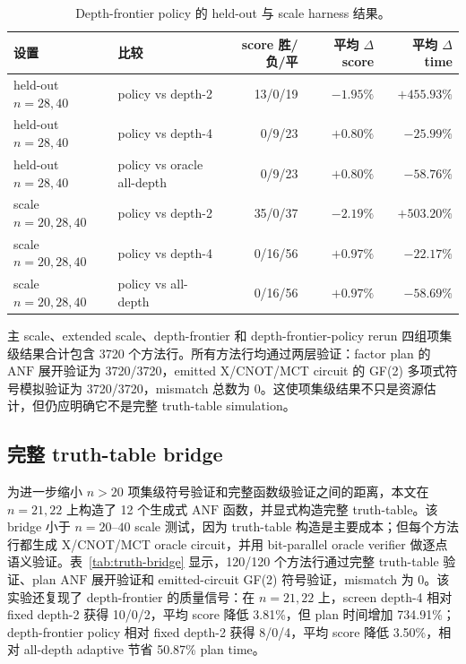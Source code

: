 \documentclass[UTF8,fontset=macnew,11pt]{ctexart}
\newcommand{\anf}{\ensuremath{\mathrm{ANF}}}
\newcommand{\ttable}{truth-table}
\begin{document}
\begin{table}[H]
\centering
\scriptsize
\caption{Depth-frontier policy 的 held-out 与 scale harness 结果。}
\label{tab:frontier-policy}
\begin{tabular}{llrrr}
\toprule
设置 & 比较 & score 胜/负/平 & 平均 $\Delta$ score & 平均 $\Delta$ time \\
\midrule
held-out $n=28,40$ & policy vs depth-2 & 13/0/19 & $-1.95\%$ & $+455.93\%$ \\
held-out $n=28,40$ & policy vs depth-4 & 0/9/23 & $+0.80\%$ & $-25.99\%$ \\
held-out $n=28,40$ & policy vs oracle all-depth & 0/9/23 & $+0.80\%$ & $-58.76\%$ \\
scale $n=20,28,40$ & policy vs depth-2 & 35/0/37 & $-2.19\%$ & $+503.20\%$ \\
scale $n=20,28,40$ & policy vs depth-4 & 0/16/56 & $+0.97\%$ & $-22.17\%$ \\
scale $n=20,28,40$ & policy vs all-depth & 0/16/56 & $+0.97\%$ & $-58.69\%$ \\
\bottomrule
\end{tabular}
\end{table}

主 scale、extended scale、depth-frontier 和 depth-frontier-policy rerun 四组项集级结果合计包含 3720 个方法行。所有方法行均通过两层验证：factor plan 的 \anf{} 展开验证为 3720/3720，emitted X/CNOT/MCT circuit 的 GF(2) 多项式符号模拟验证为 3720/3720，mismatch 总数为 0。这使项集级结果不只是资源估计，但仍应明确它不是完整 \ttable{} simulation。

\subsection{完整 truth-table bridge}

为进一步缩小 $n>20$ 项集级符号验证和完整函数级验证之间的距离，本文在 $n=21,22$ 上构造了 12 个生成式 \anf{} 函数，并显式构造完整 \ttable{}。该 bridge 小于 $n=20$--$40$ scale 测试，因为 truth-table 构造是主要成本；但每个方法行都生成 X/CNOT/MCT oracle circuit，并用 bit-parallel oracle verifier 做逐点语义验证。表~\ref{tab:truth-bridge} 显示，120/120 个方法行通过完整 \ttable{} 验证、plan \anf{} 展开验证和 emitted-circuit GF(2) 符号验证，mismatch 为 0。该实验还复现了 depth-frontier 的质量信号：在 $n=21,22$ 上，screen depth-4 相对 fixed depth-2 获得 10/0/2，平均 score 降低 3.81\%，但 plan 时间增加 734.91\%；depth-frontier policy 相对 fixed depth-2 获得 8/0/4，平均 score 降低 3.50\%，相对 all-depth adaptive 节省 50.87\% plan time。
\end{document}
